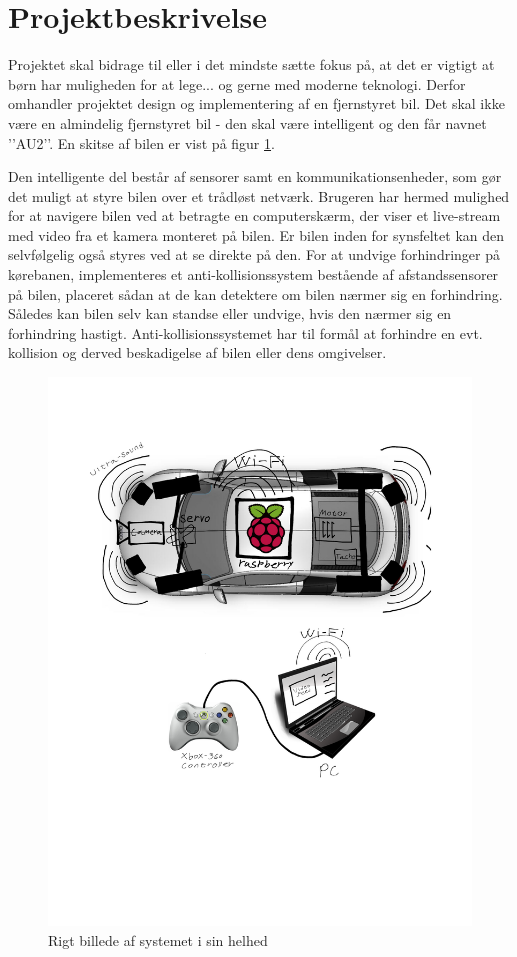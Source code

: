 \section{Projektbeskrivelse} \label{sec:beskrivelse}


Projektet skal bidrage til eller i det mindste sætte fokus på, at det er vigtigt at børn har muligheden for at lege... og gerne med moderne teknologi. Derfor omhandler projektet design og implementering af en fjernstyret bil. Det skal ikke være en almindelig fjernstyret bil - den skal være intelligent og den får navnet ’’AU2’’. En skitse af bilen er vist på figur \ref{fig:rigbillede}.

Den intelligente del består af sensorer samt en kommunikationsenheder, som gør det muligt at styre bilen over et trådløst netværk. Brugeren har hermed mulighed for at navigere bilen ved at betragte en computerskærm, der viser et live-stream med video fra et kamera monteret på bilen. Er bilen inden for synsfeltet kan den selvfølgelig også styres ved at se direkte på den. For at undvige forhindringer på kørebanen, implementeres et anti-kollisionssystem bestående af afstandssensorer på bilen, placeret sådan at de kan detektere om bilen nærmer sig en forhindring. Således kan bilen selv kan standse eller undvige, hvis den nærmer sig en forhindring hastigt. Anti-kollisionssystemet har til formål at  forhindre en evt. kollision og derved beskadigelse af bilen eller dens omgivelser.

\begin{figure}[h]
\centering
\includegraphics[width=\textwidth - 7.38 cm]{../fig/billeder/rigbillede}
\caption{Rigt billede af systemet i sin helhed}
\label{fig:rigbillede}
\end{figure}